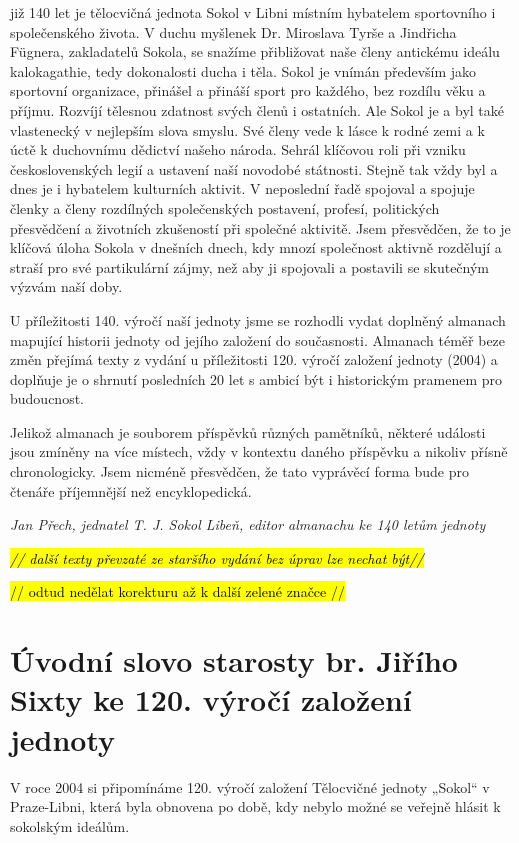 již 140 let je tělocvičná jednota Sokol v Libni místním hybatelem
sportovního i společenského života. V duchu myšlenek Dr. Miroslava Tyrše
a Jindřicha Fügnera, zakladatelů Sokola, se snažíme přibližovat naše
členy antickému ideálu kalokagathie, tedy dokonalosti ducha i těla.
Sokol je vnímán především jako sportovní organizace, přinášel a přináší
sport pro každého, bez rozdílu věku a příjmu. Rozvíjí tělesnou zdatnost
svých členů i ostatních. Ale Sokol je a byl také vlastenecký v nejlepším
slova smyslu. Své členy vede k lásce k rodné zemi a k úctě k duchovnímu
dědictví našeho národa. Sehrál klíčovou roli při vzniku československých
legií a ustavení naší novodobé státnosti. Stejně tak vždy byl a dnes je
i hybatelem kulturních aktivit. V neposlední řadě spojoval a spojuje
členky a členy rozdílných společenských postavení, profesí, politických
přesvědčení a životních zkušeností při společné aktivitě. Jsem
přesvědčen, že to je klíčová úloha Sokola v dnešních dnech, kdy mnozí
společnost aktivně rozdělují a straší pro své partikulární zájmy, než
aby ji spojovali a postavili se skutečným výzvám naší doby.

U příležitosti 140. výročí naší jednoty jsme se rozhodli vydat doplněný
almanach mapující historii jednoty od jejího založení do současnosti.
Almanach téměř beze změn přejímá texty z vydání u příležitosti 120.
výročí založení jednoty (2004) a doplňuje je o shrnutí posledních 20 let
s ambicí být i historickým pramenem pro budoucnost.

Jelikož almanach je souborem příspěvků různých pamětníků, některé
události jsou zmíněny na více místech, vždy v kontextu daného příspěvku
a nikoliv přísně chronologicky. Jsem nicméně přesvědčen, že tato
vyprávěcí forma bude pro čtenáře příjemnější než encyklopedická.

\emph{Jan Přech, jednatel T. J. Sokol Libeň, editor almanachu ke 140
letům jednoty}

\emph{\hl{// další texty převzaté ze staršího vydání bez úprav lze
nechat být//}}

\hl{// odtud nedělat korekturu až k další zelené značce //}

\section{Úvodní slovo starosty br. Jiřího Sixty ke 120. výročí založení
jednoty}\label{uxfavodnuxed-slovo-starosty-br.-jiux159uxedho-sixty-ke-120.-vuxfdroux10duxed-zaloux17eenuxed-jednoty}

V roce 2004 si připomínáme 120. výročí založení Tělocvičné jednoty
„Sokol`` v Praze-Libni, která byla obnovena po době, kdy nebylo možné se
veřejně hlásit k sokolským ideálům.

